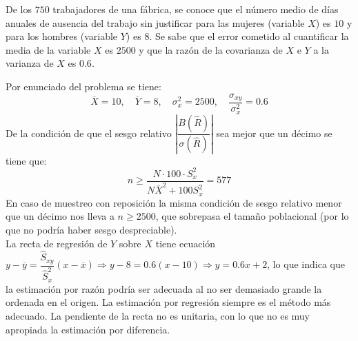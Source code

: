 \addpoints
\question[10] De los $750$ trabajadores de una fábrica, se conoce que el número medio de días anuales de ausencia del trabajo sin justificar para las mujeres (variable $X$) es $10$ y para los hombres (variable $Y$) es $8$. Se sabe que el error cometido al cuantificar la media de la variable $X$ es $2500$ y que la razón de la covarianza de $X$ e $Y$ a la varianza de $X$ es $0.6$.
\noaddpoints
{}

\begin{solution}
Por enunciado del problema se tiene:
$$\overline{X}=10,\quad \overline{Y}=8,\quad \sigma_{x}^{2}=2500,\quad \dfrac{\sigma_{xy}}{\sigma_{x}^{2}}=0.6$$
De la condición de que el sesgo relativo $|\dfrac{B(\hat{R})}{\sigma(\hat{R})}|$ sea mejor que un décimo se tiene que:
$$n \geq \dfrac{N\cdot 100 \cdot S_{x}^2}{N\overline{X}^2+100 S_{x}^2}=577$$
 En caso de muestreo con reposición la misma condición de sesgo relativo menor que un décimo nos lleva a $n\geq 2500$, que sobrepasa el tamaño poblacional (por lo que no podría haber sesgo despreciable).\\

La recta de regresión de $Y$ sobre $X$ tiene ecuación $y-\overline{y}=\dfrac{\hat{S}_{xy}}{\hat{S}_{x}^2}(x-\overline{x}) \Rightarrow y-8=0.6(x-10) \Rightarrow y=0.6x+2$, lo que indica que la estimación por razón podría ser adecuada al no ser demasiado grande la ordenada en el origen. La estimación por regresión siempre es el método más adecuado. La pendiente de la recta no es unitaria, con lo que no es muy apropiada la estimación por diferencia.
 
 
\end{solution}
